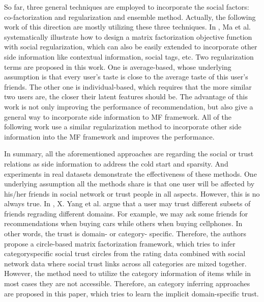 So far, three general techniques are employed to incorporate the social factors: co-factorization \cite{ma2008sorec} and regularization \cite{ma2009learningTrust}\cite{jamali2010matrix} and ensemble method\cite{ma2009llearningEnsembel}. Actually, the following work of this direction are mostly utilizing these three techniques. In \cite{ma2011recommender}, Ma et al. systematically illustrate how to design a matrix factorization objective function with social regularization, which can also be easily extended to incorporate other side information like contextual information, social tags, etc. Two regularization terms are proposed in this work. One is average-based, whose underlying assumption is that every user's taste is close to the average taste of this user's friends. The other one is individual-based, which requires that the more similar two users are, the closer their latent features should be. The advantage of this work is not only improving the performance of recommendation, but also give a general way to incorporate side information to MF framework. All of the following work \cite{Forsati:2015:PER:2792838.2800198} \cite{li2015overlapping} \cite{yang2013social} use a similar regularization method to incorporate other side information into the MF framework and improves the performance.

In summary, all the aforementioned approaches are regarding the social or trust relations as side information to address the cold start and sparsity. And experiments in real datasets demonstrate the effectiveness of these methods. One underlying assumption all the methods share is that one user will be affected by his/her friends in social network or trust people in all aspects. However, this is no always true. In \cite{yang2012circle}, X. Yang et al. argue that a user may trust different subsets of friends regrading different domains. For example, we may ask some friends for recommendations when buying cars while others when buying cellphones. In other words, the trust is domain- or category- specific. Therefore, the authors propose a circle-based matrix factorization framework, which tries to infer category\-specific social trust circles from the rating data combined with social network data where social trust links across all categories are mixed together. However, the method need to utilize the category information of items while in most cases they are not accessible. Therefore, an category inferring approaches are proposed in this paper, which tries to learn the implicit domain-specific trust.

